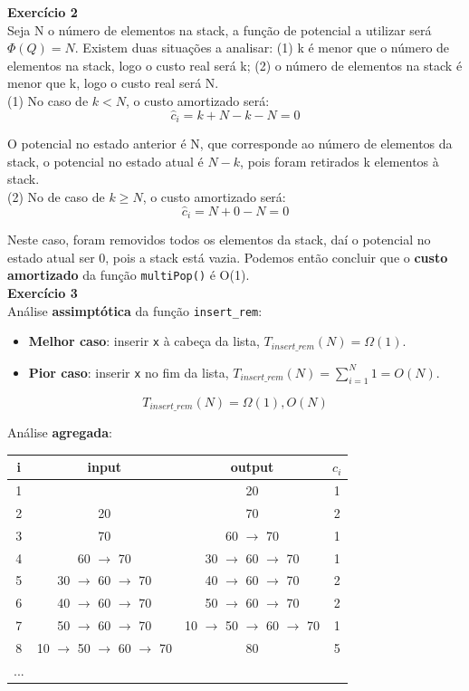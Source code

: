 \documentclass[a4paper,11pt]{article}
\begin{document}
	\noindent \textbf{Exercício 2}\\
	
	\noindent Seja N o número de elementos na stack, a função de potencial a utilizar será $\Phi(Q) = N$. Existem duas situações a analisar: (1) k é menor que o número de elementos na stack, logo o custo real será k; (2) o número de elementos na stack é menor que k, logo o custo real será N.\\
	
	\noindent (1) No caso de $ k < N $, o custo amortizado será:
	\[
		\hat{c}_i = k + N - k - N = 0
	\]
	
	\noindent O potencial no estado anterior é N, que corresponde ao número de elementos da stack, o potencial no estado atual é $ N - k $, pois foram retirados k elementos à stack.\\
	
	\noindent (2) No de caso de $ k \geq N $, o custo amortizado será:
	\[
		\hat{c}_i = N + 0 - N = 0
	\]
	
	\noindent Neste caso, foram removidos todos os elementos da stack, daí o potencial no estado atual ser 0, pois a stack está vazia. Podemos então concluir que o \textbf{custo amortizado} da função \texttt{multiPop()} é O(1).\\
	
	\noindent \textbf{Exercício 3}\\
	
	\noindent Análise \textbf{assimptótica} da função \texttt{insert\_rem}:
	\begin{itemize}
		\item \textbf{Melhor caso}: inserir \texttt{x} à cabeça da lista, $ T_{insert\_rem}(N) = \Omega(1) $.
		\item \textbf{Pior caso}: inserir \texttt{x} no fim da lista, $ T_{insert\_rem}(N) = \sum_{i=1}^{N} 1 = O(N) $.
	\end{itemize}
	\[
		T_{insert\_rem}(N) = \Omega(1), O(N)
	\]
	
	\noindent Análise \textbf{agregada}:
	
	\begin{center}
	\begin{tabular}{|c|c|c|c|}
		\hline
		i & input & output & $ c_i $ \\
		\hline
		\hline
		1 & & 20 & 1 \\
		2 & 20 & 70 & 2 \\
		3 & 70 & 60 $\rightarrow$ 70 & 1 \\
		4 & 60 $\rightarrow$ 70 & 30 $\rightarrow$ 60 $\rightarrow$ 70 & 1 \\
		5 & 30 $\rightarrow$ 60 $\rightarrow$ 70 & 40 $\rightarrow$ 60 $\rightarrow$ 70 & 2 \\
		6 & 40 $\rightarrow$ 60 $\rightarrow$ 70 & 50 $\rightarrow$ 60 $\rightarrow$ 70 & 2 \\
		7 & 50 $\rightarrow$ 60 $\rightarrow$ 70 & 10 $\rightarrow$ 50 $\rightarrow$ 60 $\rightarrow$ 70 & 1 \\
		8 & 10 $\rightarrow$ 50 $\rightarrow$ 60 $\rightarrow$ 70 & 80 & 5 \\
		... & & & \\
		\hline
	\end{tabular}
	\end{center}
	
\end{document}

